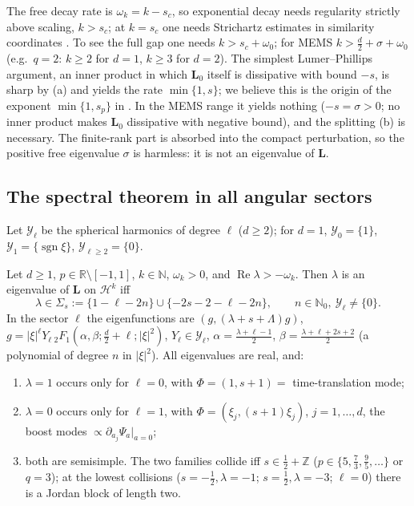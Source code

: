 \begin{remark}\label{power:rem-LP}
The free decay rate is $\omega_k=k-s_c$, so exponential decay needs regularity
strictly above scaling, $k>s_c$; at $k=s_c$ one needs Strichartz estimates in
similarity coordinates \cite{Donninger2017,DonningerRao2018,Wallauch2022}. To
see the full gap one needs $k>s_c+\omega_0$; for MEMS $k>\frac d2+\sigma+\omega_0$
(e.g.\ $q=2$: $k\ge2$ for $d=1$, $k\ge3$ for $d=2$). The simplest
Lumer--Phillips argument, an inner product in which $\mathbf L_0$ itself is
dissipative with bound $-s$, is sharp by (a) and yields the rate
$\min\{1,s\}$; we believe this is the origin of the exponent $\min\{1,s_p\}$ in
\cite{Ostermann2024}. In the MEMS range it yields nothing ($-s=\sigma>0$; no
inner product makes $\mathbf L_0$ dissipative with negative bound), and the
splitting (b) is necessary. The finite-rank part is absorbed into the compact
perturbation, so the positive free eigenvalue $\sigma$ is harmless: it is not an
eigenvalue of $\mathbf L$.
\end{remark}

\subsection{The spectral theorem in all angular sectors}
\label{power:subsec-spectrum}

Let $\mathcal Y_\ell$ be the spherical harmonics of degree $\ell$ ($d\ge2$); for
$d=1$, $\mathcal Y_0=\{1\}$, $\mathcal Y_1=\{\operatorname{sgn}\xi\}$, $\mathcal Y_{\ell\ge2}=\{0\}$.

\begin{theorem}\label{power:thm-spectrum}
Let $d\ge1$, $p\in\mathbb R\setminus[-1,1]$, $k\in\mathbb N$, $\omega_k>0$, and
$\operatorname{Re}\lambda>-\omega_k$. Then $\lambda$ is an eigenvalue of $\mathbf L$ on
$\mathcal H^k$ iff
\[
  \lambda\in\Sigma_s:=\{1-\ell-2n\}\cup\{-2s-2-\ell-2n\},\qquad n\in\mathbb N_0,\ \mathcal Y_\ell\neq\{0\}.
\]
In the sector $\ell$ the eigenfunctions are $(g,(\lambda+s+\Lambda)g)$,
$g=|\xi|^\ell Y_\ell\,{}_2F_1(\alpha,\beta;\frac d2+\ell;|\xi|^2)$, $Y_\ell\in\mathcal Y_\ell$,
$\alpha=\frac{\lambda+\ell-1}{2}$, $\beta=\frac{\lambda+\ell+2s+2}{2}$ (a polynomial of
degree $n$ in $|\xi|^2$). All eigenvalues are real, and:
\begin{enumerate}[nosep,label=(\alph*)]
\item $\lambda=1$ occurs only for $\ell=0$, with $\Phi=(1,s+1)=$ time-translation mode;
\item $\lambda=0$ occurs only for $\ell=1$, with $\Phi=(\xi_j,(s+1)\xi_j)$,
  $j=1,\dots,d$, the boost modes $\propto\partial_{a_j}\Psi_a|_{a=0}$;
\item both are semisimple. The two families collide iff $s\in\frac12+\mathbb Z$
  ($p\in\{5,\frac73,\frac95,\dots\}$ or $q=3$); at the lowest collisions
  ($s=-\frac12,\lambda=-1$; $s=\frac12,\lambda=-3$; $\ell=0$) there is a Jordan block of
  length two.
\end{enumerate}
\end{theorem}

